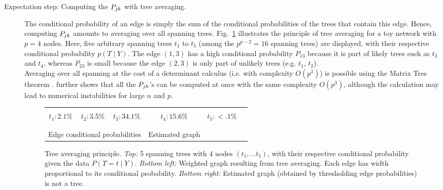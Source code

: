 \begin{description}

\item[Expectation step: Computing the $P_{jk}$ with tree averaging.] The conditional probability of an edge is simply the sum of the conditional probabilities of the trees that contain this edge. Hence, computing $P_{jk}$ amounts to averaging over all spanning trees.
Fig.~\ref{fig:treeaveraging} illustrates the principle of tree averaging for a toy network with $p=4$ nodes. Here, five arbitrary spanning trees $t_1$ to $t_5$ (among the $p^{p-2} = 16$ spanning trees) are displayed, with their respective conditional probability $p(T \mid Y)$. 
The edge $(1, 3)$ has a high conditional probability $P_{13}$ because it is part of likely trees such as $t_3$ and $t_4$, whereas $P_{23}$ is small because the edge $(2, 3)$ is only part of unlikely trees (e.g. $t_1$, $t_2$). \\
Averaging over all spanning at the cost of a determinant calculus (i.e. with complexity $O(p^3)$) is possible using the Matrix Tree theorem \citep[][recalled as Theorem~\ref{thm:MTT} in Appendix~\ref{app:MTT}]{matrixtree}. 
\citet{kirshner} further shows that all the $P_{jk}$'s can be computed at once with the same complexity $O(p^3)$, although the calculation may lead to numerical instabilities for large $n$ and $p$.



\begin{figure}[H]
   \begin{center}
    \begin{tabular}{cccccc}
         &
         &
         &
         &
         \\
        $t_1: 2.1\%$ & 
        $t_2: 3.5\%$ & 
        $t_3: 34.1\%$ & 
        $t_4: 15.6\%$ & 
        $t_5:  <.1\%$ \\ \\
        & 
         &
        \qquad \qquad &
         \\
        \multicolumn{3}{c}{Edge conditional probabilities} & Estimated graph \\
    \end{tabular}
    \caption{Tree averaging principle. 
    \textit{Top:} 5 spanning trees with 4 nodes  $(t_1, \dots t_5)$, with their respective conditional probability given the data $P(T = t \mid Y)$.
    \textit{Bottom left:} Weighted graph resulting from tree averaging. Each edge  has width proportional to its conditional probability. \textit{ Bottom right:} Estimated graph (obtained by thresholding edge probabilities) is not a tree.}
    \label{fig:treeaveraging}
   \end{center}
\end{figure}


\end{description}
